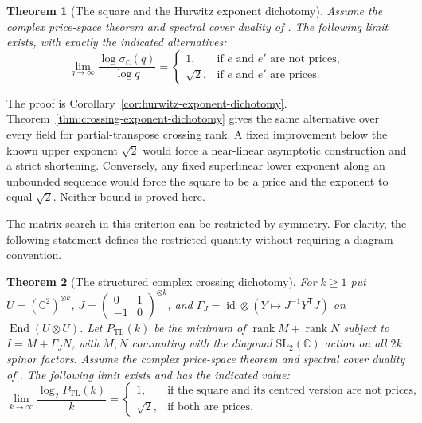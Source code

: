 \documentclass[11pt,a4paper]{article}
\newcommand{\C}{\mathbb C}
\newtheorem{theorem}{Theorem}[section]
\theoremstyle{definition}
\theoremstyle{remark}
\begin{document}
\begin{theorem}[The square and the Hurwitz exponent dichotomy]
\label{thm:intro-hurwitz-dichotomy}
Assume the complex price-space theorem and spectral cover duality
of \cite[Proposition C.3 and Theorem A.6]{Anthropic2026}.
The following limit exists, with exactly the indicated alternatives:
\[
 \lim_{q\to\infty}\frac{\log\sigma_\C(q)}{\log q}
 =
 \begin{cases}
 1,&\text{if $e$ and $e'$ are not prices},\\
 \sqrt2,&\text{if $e$ and $e'$ are prices}.
 \end{cases}
\]
\end{theorem}

The proof is Corollary~\ref{cor:hurwitz-exponent-dichotomy}.
Theorem~\ref{thm:crossing-exponent-dichotomy} gives the same
alternative over every field for partial-transpose crossing rank.
A fixed improvement below the known upper exponent $\sqrt2$
would force a near-linear asymptotic construction and a strict
shortening. Conversely, any fixed superlinear lower exponent
along an unbounded sequence would force the square to be a
price and the exponent to equal $\sqrt2$. Neither bound is proved
here.

The matrix search in this criterion can be restricted by symmetry.
For clarity, the following statement defines the restricted quantity
without requiring a diagram convention.

\begin{theorem}[The structured complex crossing dichotomy]
\label{thm:intro-centralizer-dichotomy}
For $k\geq1$ put $U=(\mathbb C^2)^{\otimes k}$,
$J=\left(\begin{smallmatrix}0&1\\-1&0\end{smallmatrix}\right)^{\otimes k}$,
and $\Gamma_J=\operatorname{id}\otimes(Y\mapsto J^{-1}Y^{\mathsf T}J)$
on $\operatorname{End}(U\otimes U)$.
Let $P_{\mathrm{TL}}(k)$ be the minimum of
$\operatorname{rank}M+\operatorname{rank}N$ subject to
$I=M+\Gamma_JN$, with $M,N$ commuting with the diagonal
$\mathrm{SL}_2(\mathbb C)$ action on all $2k$ spinor factors.
Assume the complex price-space theorem and spectral cover duality
of \cite[Proposition C.3 and Theorem A.6]{Anthropic2026}.
The following limit exists and has the indicated value:
\[
 \lim_{k\to\infty}\frac{\log_2P_{\mathrm{TL}}(k)}{k}
 =\begin{cases}
 1,&\text{if the square and its centred version are not prices},\\
 \sqrt2,&\text{if both are prices}.
 \end{cases}
\]
\end{theorem}
\end{document}
